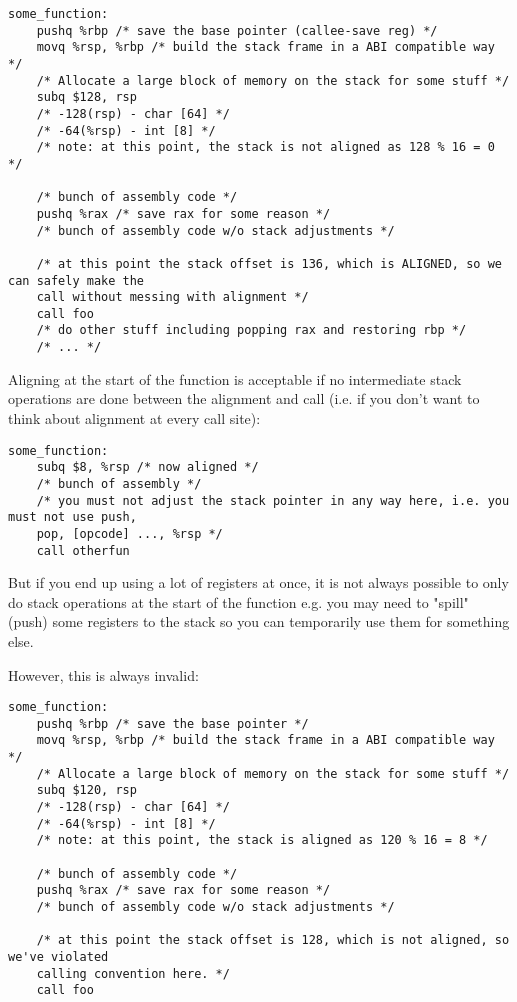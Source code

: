 \documentclass[11pt]{article}
\begin{document}
\begin{lstlisting}
some_function:
    pushq %rbp /* save the base pointer (callee-save reg) */
    movq %rsp, %rbp /* build the stack frame in a ABI compatible way */
    /* Allocate a large block of memory on the stack for some stuff */
    subq $128, rsp
    /* -128(rsp) - char [64] */
    /* -64(%rsp) - int [8] */
    /* note: at this point, the stack is not aligned as 128 % 16 = 0 */

    /* bunch of assembly code */
    pushq %rax /* save rax for some reason */
    /* bunch of assembly code w/o stack adjustments */

    /* at this point the stack offset is 136, which is ALIGNED, so we can safely make the
    call without messing with alignment */
    call foo
    /* do other stuff including popping rax and restoring rbp */
    /* ... */
\end{lstlisting}

Aligning at the start of the function is acceptable if no intermediate stack operations
are done between the alignment and call (i.e. if you don't want to think about alignment
at every call site):

\begin{lstlisting}
some_function:
    subq $8, %rsp /* now aligned */
    /* bunch of assembly */
    /* you must not adjust the stack pointer in any way here, i.e. you must not use push,
    pop, [opcode] ..., %rsp */
    call otherfun
\end{lstlisting}

But if you end up using a lot of registers at once, it is not always possible to only do
stack operations at the start of the function e.g. you may need to "spill" (push) some
registers to the stack so you can temporarily use them for something else.

However, this is always invalid:

\begin{lstlisting}
some_function:
    pushq %rbp /* save the base pointer */
    movq %rsp, %rbp /* build the stack frame in a ABI compatible way */
    /* Allocate a large block of memory on the stack for some stuff */
    subq $120, rsp
    /* -128(rsp) - char [64] */
    /* -64(%rsp) - int [8] */
    /* note: at this point, the stack is aligned as 120 % 16 = 8 */

    /* bunch of assembly code */
    pushq %rax /* save rax for some reason */
    /* bunch of assembly code w/o stack adjustments */

    /* at this point the stack offset is 128, which is not aligned, so we've violated
    calling convention here. */
    call foo
\end{lstlisting}
\end{document}
